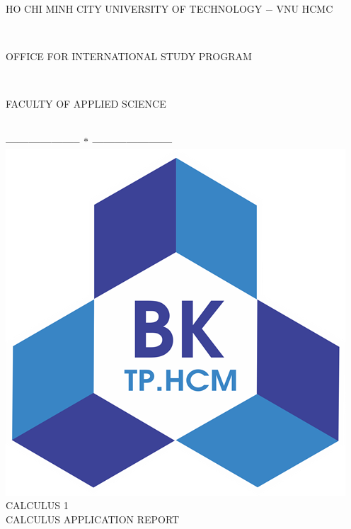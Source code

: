 \documentclass[13pt,a4paper]{report}
\begin{document}
\fontsize{13pt}{18pt}\selectfont
\begin{titlepage}
\thispagestyle{empty}
\thisfancypage{%
\setlength{\fboxsep}{0pt}%
\fbox}{} %
\

\begin{center}
\vspace{-0.25cm}
\begin{large}
HO CHI MINH CITY UNIVERSITY OF TECHNOLOGY $-$ VNU HCMC
\end{large} \\
\begin{large}
OFFICE FOR INTERNATIONAL STUDY PROGRAM
\end{large} \\
\begin{large}
FACULTY OF APPLIED SCIENCE
\end{large} \\
\textbf{--------------------  $\ast$  ---------------------}\\[2.75cm]

\includegraphics[scale=1]{images/logoBK.png}\\[1cm]
{\fontsize{20pt}{1}\selectfont CALCULUS 1}\\[1ex]
{\fontsize{20pt}{1}\selectfont CALCULUS APPLICATION REPORT}\\[2.75cm]
\end{center}


\end{titlepage}
\end{document}
